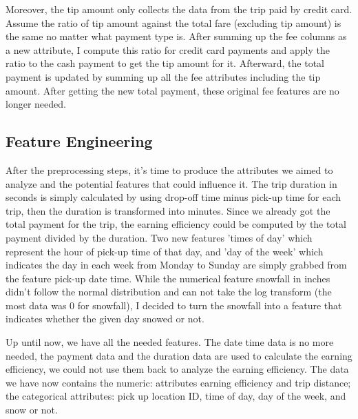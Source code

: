 \documentclass[11pt]{article}
\begin{document}
Moreover, the tip amount only collects the data from the trip paid by credit card. Assume the ratio of tip amount against the total fare (excluding tip amount) is the same no matter what payment type is. After summing up the fee columns as a new attribute, I compute this ratio for credit card payments and apply the ratio to the cash payment to get the tip amount for it. Afterward, the total payment is updated by summing up all the fee attributes including the tip amount. After getting the new total payment, these original fee features are no longer needed.

\subsection{Feature Engineering}
After the preprocessing steps, it's time to produce the attributes we aimed to analyze and the potential features that could influence it. The trip duration in seconds is simply calculated by using drop-off time minus pick-up time for each trip, then the duration is transformed into minutes. Since we already got the total payment for the trip, the earning efficiency could be computed by the total payment divided by the duration. Two new features 'times of day' which represent the hour of pick-up time of that day, and 'day of the week' which indicates the day in each week from Monday to Sunday are simply grabbed from the feature pick-up date time. While the numerical feature snowfall in inches didn't follow the normal distribution and can not take the log transform (the most data was 0 for snowfall), I decided to turn the snowfall into a feature that indicates whether the given day snowed or not.

Up until now, we have all the needed features. The date time data is no more needed, the payment data and the duration data are used to calculate the earning efficiency, we could not use them back to analyze the earning efficiency. The data we have now contains the numeric: attributes earning efficiency and trip distance; the categorical attributes: pick up location ID, time of day, day of the week, and snow or not.
\end{document}

